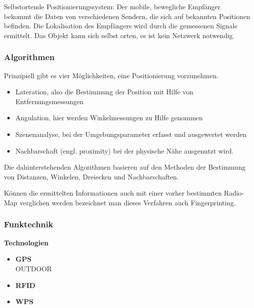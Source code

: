     Selbstortende Positionierungssystem: Der mobile, bewegliche Empfänger bekommt die Daten von verschiedenen Sendern, die sich auf bekannten Positionen befinden.
    Die Lokalisation des Empfängers wird durch die gemessenen Signale ermittelt. Das Objekt kann sich selbst orten, es ist kein Netzwerk notwendig.



    \subsubsection{Algorithmen}

    Prinzipiell gibt es vier Möglichkeiten, eine Positionierung vorzunehmen.
    \begin{itemize}
      \item Lateration, also die Bestimmung der Position mit Hilfe von Entfernungsmessungen
      \item Angulation, hier werden Winkelmessungen zu Hilfe genommen
      \item Szenenanalyse, bei der Umgebungsparameter erfasst und ausgewertet werden
      \item Nachbarschaft (engl. proximity) bei der physische Nähe ausgenutzt wird.
    \end{itemize}

    Die dahinterstehenden Algorithmen basieren auf den Methoden der Bestimmung von Distanzen, Winkelen, Dreiecken und Nachbarschaften.

    Können die ermittelten Informationen auch mit einer vorher bestimmten Radio-Map verglichen werden bezeichnet man dieses Verfahren auch Fingerprinting.



    \subsubsection{Funktechnik}


    \textbf{Technologien}\\
    \begin{itemize}
        \item \textbf{GPS}\\
        OUTDOOR
        \item \textbf{RFID}\\
        \item \textbf{WPS}\\
      \end{itemize}

